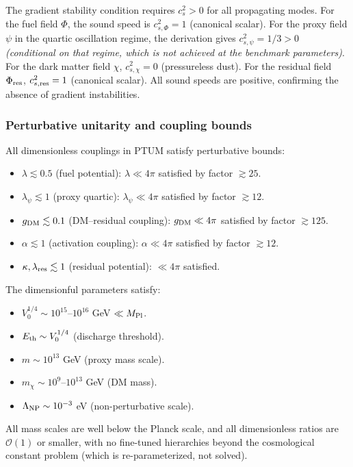 \documentclass[epj]{svjour}
\begin{document}
The gradient stability condition requires \(c_s^2 > 0\) for all
propagating modes. For the fuel field \(\Phi\), the sound speed is
\(c_{s,\Phi}^2 = 1\) (canonical scalar). For the proxy field
\(\psi\) in the quartic oscillation regime, the derivation gives
\(c_{s,\psi}^2 = 1/3 > 0\) \emph{(conditional on that regime, which is
not achieved at the benchmark parameters)}. For the dark matter field \(\chi\),
\(c_{s,\chi}^2 = 0\) (pressureless dust). For the residual field
\(\Phi_{\rm res}\), \(c_{s,\rm res}^2 = 1\) (canonical scalar).
All sound speeds are positive, confirming the absence of gradient
instabilities.

\subsubsection{Perturbative unitarity and coupling bounds}
\label{sec:perturbative_unitarity}

All dimensionless couplings in PTUM satisfy perturbative bounds:
\begin{itemize}
\item \(\lambda \lesssim 0.5\) (fuel potential): \(\lambda \ll 4\pi\)
      satisfied by factor \(\gtrsim 25\).
\item \(\lambda_\psi \lesssim 1\) (proxy quartic): \(\lambda_\psi \ll
      4\pi\) satisfied by factor \(\gtrsim 12\).
\item \(g_{\rm DM} \lesssim 0.1\) (DM--residual coupling):
      \(g_{\rm DM} \ll 4\pi\) satisfied by factor \(\gtrsim 125\).
\item \(\alpha \lesssim 1\) (activation coupling): \(\alpha \ll 4\pi\)
      satisfied by factor \(\gtrsim 12\).
\item \(\kappa, \lambda_{\rm res} \lesssim 1\) (residual potential):
      \(\ll 4\pi\) satisfied.
\end{itemize}
The dimensionful parameters satisfy:
\begin{itemize}
\item \(V_0^{1/4} \sim 10^{15}\)--\(10^{16}\) GeV \(\ll M_{\rm Pl}\).
\item \(E_{\rm th} \sim V_0^{1/4}\) (discharge threshold).
\item \(m \sim 10^{13}\) GeV (proxy mass scale).
\item \(m_\chi \sim 10^{9}\)--\(10^{13}\) GeV (DM mass).
\item \(\Lambda_{\rm NP} \sim 10^{-3}\) eV (non-perturbative scale).
\end{itemize}
All mass scales are well below the Planck scale, and all
dimensionless ratios are \(\mathcal{O}(1)\) or smaller, with no
fine-tuned hierarchies beyond the cosmological constant problem
(which is re-parameterized, not solved).
\end{document}
